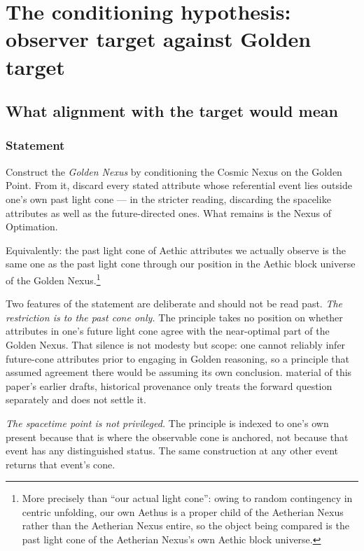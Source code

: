 \section{The conditioning hypothesis: observer target against Golden target}\label{sec:conditioning}

\subsection{What alignment with the target would mean}\label{gc:sub:pastalign}

\subsubsection{Statement}\label{gc:subsub:pastalign-statement}

\begin{principle}
\label{gc:prin:pastalign}
Construct the \emph{Golden Nexus} by conditioning the Cosmic Nexus on
the Golden Point. From it, discard every stated attribute whose
referential event lies outside one's own past light cone --- in the
stricter reading, discarding the spacelike attributes as well as the
future-directed ones. What remains is the Nexus of Optimation.

Equivalently: the past light cone of Aethic attributes we actually
observe is the same one as the past light cone through our position in
the Aethic block universe of the Golden Nexus.\footnote{More precisely
than ``our actual light cone'': owing to random contingency in centric
unfolding, our own Aethus is a proper child of the Aetherian Nexus
rather than the Aetherian Nexus entire, so the object being compared is
the past light cone of the Aetherian Nexus's own Aethic block universe.}
\end{principle}

Two features of the statement are deliberate and should not be read past. \emph{The restriction is to the past cone only.} The principle takes no
position on whether attributes in one's future light cone agree with the
near-optimal part of the Golden Nexus. That silence is not modesty but
scope: one cannot reliably infer future-cone attributes prior to
engaging in Golden reasoning, so a principle that assumed agreement
there would be assuming its own conclusion.
material of this paper's earlier drafts, historical provenance only treats the forward question separately and
does not settle it.

\emph{The spacetime point is not privileged.} The principle is indexed
to one's own present because that is where the observable cone is
anchored, not because that event has any distinguished status. The same
construction at any other event returns that event's cone.

